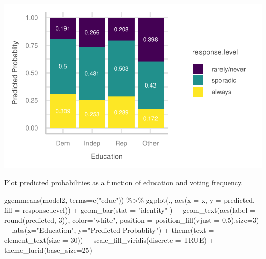 \documentclass[
  letterpaper,
  DIV=11,
  numbers=noendperiod]{scrartcl}
\newenvironment{Shaded}{\begin{snugshade}}{\end{snugshade}}
\newcommand{\AttributeTok}[1]{\textcolor[rgb]{0.40,0.45,0.13}{#1}}
\newcommand{\ConstantTok}[1]{\textcolor[rgb]{0.56,0.35,0.01}{#1}}
\newcommand{\DecValTok}[1]{\textcolor[rgb]{0.68,0.00,0.00}{#1}}
\newcommand{\FloatTok}[1]{\textcolor[rgb]{0.68,0.00,0.00}{#1}}
\newcommand{\FunctionTok}[1]{\textcolor[rgb]{0.28,0.35,0.67}{#1}}
\newcommand{\NormalTok}[1]{\textcolor[rgb]{0.00,0.23,0.31}{#1}}
\newcommand{\SpecialCharTok}[1]{\textcolor[rgb]{0.37,0.37,0.37}{#1}}
\newcommand{\StringTok}[1]{\textcolor[rgb]{0.13,0.47,0.30}{#1}}
\begin{document}
\includegraphics{Lab4_multinom_Questions-1_files/figure-pdf/unnamed-chunk-14-2.pdf}

Plot predicted probabilities as a function of education and voting
frequency.

\begin{Shaded}
\begin{Highlighting}[]
 \FunctionTok{ggemmeans}\NormalTok{(model2, }\AttributeTok{terms=}\FunctionTok{c}\NormalTok{(}\StringTok{"educ"}\NormalTok{)) }\SpecialCharTok{\%\textgreater{}\%} \FunctionTok{ggplot}\NormalTok{(., }\FunctionTok{aes}\NormalTok{(}\AttributeTok{x =}\NormalTok{ x, }\AttributeTok{y =}\NormalTok{ predicted, }\AttributeTok{fill =}\NormalTok{ response.level)) }\SpecialCharTok{+} 
  \FunctionTok{geom\_bar}\NormalTok{(}\AttributeTok{stat =} \StringTok{"identity"}\NormalTok{ ) }\SpecialCharTok{+}
    \FunctionTok{geom\_text}\NormalTok{(}\FunctionTok{aes}\NormalTok{(}\AttributeTok{label =} \FunctionTok{round}\NormalTok{(predicted, }\DecValTok{3}\NormalTok{)), }\AttributeTok{color=}\StringTok{"white"}\NormalTok{, }\AttributeTok{position =} \FunctionTok{position\_fill}\NormalTok{(}\AttributeTok{vjust =} \FloatTok{0.5}\NormalTok{),}\AttributeTok{size=}\DecValTok{3}\NormalTok{)  }\SpecialCharTok{+} 
  \FunctionTok{labs}\NormalTok{(}\AttributeTok{x=}\StringTok{"Education"}\NormalTok{, }\AttributeTok{y=}\StringTok{"Predicted Probablity"}\NormalTok{) }\SpecialCharTok{+} 
  \FunctionTok{theme}\NormalTok{(}\AttributeTok{text =} \FunctionTok{element\_text}\NormalTok{(}\AttributeTok{size =} \DecValTok{30}\NormalTok{)) }\SpecialCharTok{+}  
  \FunctionTok{scale\_fill\_viridis}\NormalTok{(}\AttributeTok{discrete =} \ConstantTok{TRUE}\NormalTok{) }\SpecialCharTok{+} 
  \FunctionTok{theme\_lucid}\NormalTok{(}\AttributeTok{base\_size=}\DecValTok{25}\NormalTok{)}
\end{Highlighting}
\end{Shaded}
\end{document}
